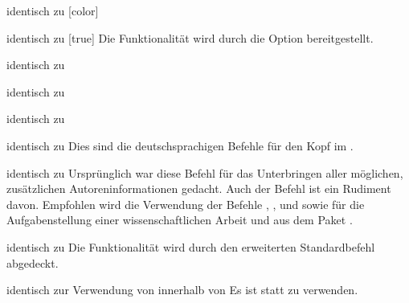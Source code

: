 \begin{Declaration*}{}
\begin{Declaration}{}{%
  identisch zu [color]%
}
\begin{Declaration}{}{%
  identisch zu [true]%
}
\printdeclarationlist%
%
Die Funktionalität wird durch die Option  bereitgestellt.
\end{Declaration}
\end{Declaration}

\begin{Declaration}{}{%
  identisch zu 
}
\begin{Declaration}{}{%
  identisch zu 
}
\begin{Declaration}{}{%
  identisch zu 
}
\begin{Declaration}{}{%
  identisch zu 
}
\printdeclarationlist%
%
Dies sind die deutschsprachigen Befehle für den Kopf im \CD.
\end{Declaration}
\end{Declaration}
\end{Declaration}
\end{Declaration}

\begin{Declaration}{}{%
  identisch zu %
}
\printdeclarationlist%
%
Ursprünglich war diese Befehl für das Unterbringen aller möglichen, 
zusätzlichen Autoreninformationen gedacht. Auch der Befehl  
ist ein Rudiment davon. Empfohlen wird die Verwendung der Befehle 
, ,  und 
 sowie für die Aufgabenstellung einer 
wissenschaftlichen Arbeit  und  aus dem Paket 
.
\end{Declaration}

\begin{Declaration}{}{%
  identisch zu %
}
\printdeclarationlist%
%
Die Funktionalität wird durch den erweiterten Standardbefehl  
abgedeckt.
\end{Declaration}

\begin{Declaration}{}{%
  identisch zur Verwendung von  innerhalb von %
}
\printdeclarationlist%
%
Es ist 
statt  zu verwenden.
\end{Declaration}


\end{Declaration*}
